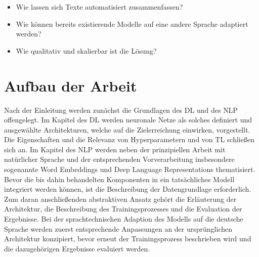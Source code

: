 \begin{itemize}
	\item Wie lassen sich Texte automatisiert zusammenfassen?
	\item Wie können bereits existierende Modelle auf eine andere Sprache adaptiert werden?
	\item Wie qualitativ und skalierbar ist die Lösung?
\end{itemize}


\section{Aufbau der Arbeit}
Nach der Einleitung werden zunächst die Grundlagen des \ac{DL} und des \ac{NLP} offengelegt. Im Kapitel des \ac{DL} werden neuronale Netze als solches definiert und ausgewählte Architekturen, welche auf die Zielerreichung einwirken, vorgestellt. Die Eigenschaften und die Relevanz von Hyperparametern und von \ac{TL} schließen sich an. Im Kapitel des \ac{NLP} werden neben der prinzipiellen Arbeit mit natürlicher Sprache und der entsprechenden Vorverarbeitung insbesondere sogenannte Word Embeddings und Deep Language Representations thematisiert. Bevor die bis dahin behandelten Komponenten in ein tatsächliches Modell integriert werden können, ist die Beschreibung der Datengrundlage erforderlich. Zum daran anschließenden abstraktiven Ansatz gehört die Erläuterung der Architektur, die Beschreibung des Trainingsprozesses und die Evaluation der Ergebnisse. Bei der sprachtechnischen Adaption des Modells auf die deutsche Sprache werden zuerst entsprechende Anpassungen an der ursprünglichen Architektur konzipiert, bevor erneut der Trainingsprozess beschrieben wird und die dazugehörigen Ergebnisse evaluiert werden.


